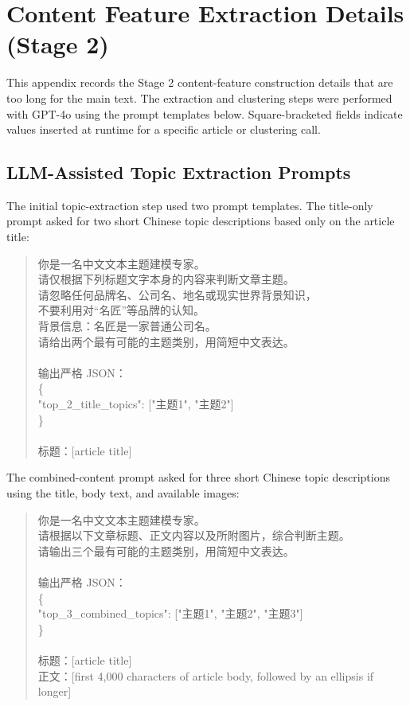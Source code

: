 \chapter{Content Feature Extraction Details (Stage 2)}
\label{app:content-feature-extraction}

This appendix records the Stage 2 content-feature construction details that are too long for the main text. The extraction and clustering steps were performed with GPT-4o using the prompt templates below. Square-bracketed fields indicate values inserted at runtime for a specific article or clustering call.

\section{LLM-Assisted Topic Extraction Prompts}
\label{app:a-topic-extraction-prompts}

The initial topic-extraction step used two prompt templates. The title-only prompt asked for two short Chinese topic descriptions based only on the article title:

\begin{quote}
\small
{}
{\cjkfont
你是一名中文文本主题建模专家。\\
请仅根据下列标题文字本身的内容来判断文章主题。\\
请忽略任何品牌名、公司名、地名或现实世界背景知识，\\
不要利用对“名匠”等品牌的认知。\\
背景信息：名匠是一家普通公司名。\\
请给出两个最有可能的主题类别，用简短中文表达。\\
\\
输出严格 JSON：\\
\{\\
\quad "top\_2\_title\_topics": ["主题1", "主题2"]\\
\}\\
\\
标题：[article title]
}
\end{quote}

The combined-content prompt asked for three short Chinese topic descriptions using the title, body text, and available images:

\begin{quote}
\small
{}
{\cjkfont
你是一名中文文本主题建模专家。\\
请根据以下文章标题、正文内容以及所附图片，综合判断主题。\\
请输出三个最有可能的主题类别，用简短中文表达。\\
\\
输出严格 JSON：\\
\{\\
\quad "top\_3\_combined\_topics": ["主题1", "主题2", "主题3"]\\
\}\\
\\
标题：[article title]\\
正文：[first 4,000 characters of article body, followed by an ellipsis if longer]
}
\end{quote}

